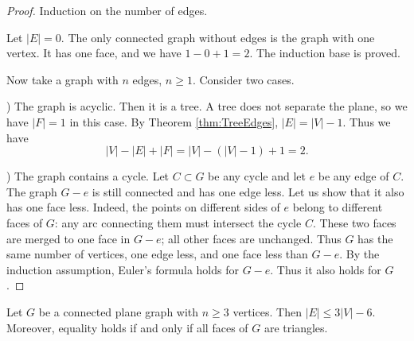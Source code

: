 \begin{page}
\setcounter{section}{3}
\setcounter{subsection}{2}
\setcounter{dfn}{8}
\label{portion:345}


\begin{proof}
Induction on the number of edges.

Let $|E| = 0$. The only connected graph without edges is the graph with one vertex.
It has one face, and we have $1 - 0 + 1 = 2$. The induction base is proved.

Now take a graph with $n$ edges, $n \ge 1$.
Consider two cases.

) The graph is acyclic.
Then it is a tree. A tree does not separate the plane, so we have $|F| = 1$ in this case.
By Theorem \ref{thm:TreeEdges}, $|E| = |V|-1$.
Thus we have
\[
|V| - |E| + |F| = |V| - (|V|-1) + 1 = 2.
\]

) The graph contains a cycle.
Let $C \subset G$ be any cycle and let $e$ be any edge of $C$.
The graph $G - e$ is still connected and has one edge less.
Let us show that it also has one face less.
Indeed, the points on different sides of $e$ belong to different faces of $G$:
any arc connecting them must intersect the cycle $C$.
These two faces are merged to one face in $G - e$; all other faces are unchanged.
Thus $G$ has the same number of vertices, one edge less, and one face less than $G - e$.
By the induction assumption, Euler's formula holds for $G - e$.
Thus it also holds for $G$.
\end{proof}



\end{page}

\begin{page}
\setcounter{section}{3}
\setcounter{subsection}{2}
\setcounter{dfn}{9}
\label{portion:347}

\begin{thm}
\label{thm:3V-6}
Let $G$ be a connected plane graph with $n \ge 3$ vertices.
Then $|E| \le 3|V| - 6$.
Moreover, equality holds if and only if all faces of $G$ are triangles.
\end{thm}

\end{page}

